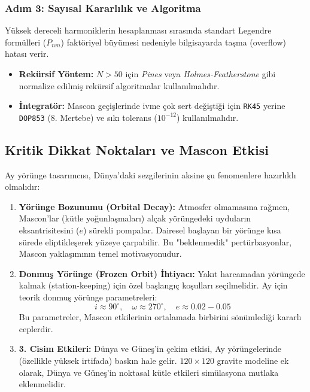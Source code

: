 \subsubsection{Adım 3: Sayısal Kararlılık ve Algoritma}
Yüksek dereceli harmoniklerin hesaplanması sırasında standart Legendre formülleri ($P_{nm}$) faktöriyel büyümesi nedeniyle bilgisayarda taşma (overflow) hatası verir.
\begin{itemize}
    \item \textbf{Rekürsif Yöntem:} $N > 50$ için \textit{Pines} veya \textit{Holmes-Featherstone} gibi normalize edilmiş rekürsif algoritmalar kullanılmalıdır.
    \item \textbf{İntegratör:} Mascon geçişlerinde ivme çok sert değiştiği için \texttt{RK45} yerine \texttt{DOP853} (8. Mertebe) ve sıkı tolerans ($10^{-12}$) kullanılmalıdır.
\end{itemize}

\subsection{Kritik Dikkat Noktaları ve Mascon Etkisi}

Ay yörünge tasarımcısı, Dünya'daki sezgilerinin aksine şu fenomenlere hazırlıklı olmalıdır:

\begin{enumerate}
    \item \textbf{Yörünge Bozunumu (Orbital Decay):} 
    Atmosfer olmamasına rağmen, Mascon'lar (kütle yoğunlaşmaları) alçak yörüngedeki uyduların eksantrisitesini ($e$) sürekli pompalar. Dairesel başlayan bir yörünge kısa sürede eliptikleşerek yüzeye çarpabilir. Bu "beklenmedik" pertürbasyonlar, Mascon yaklaşımının temel motivasyonudur.
    
    \item \textbf{Donmuş Yörünge (Frozen Orbit) İhtiyacı:}
    Yakıt harcamadan yörüngede kalmak (station-keeping) için özel başlangıç koşulları seçilmelidir. Ay için teorik donmuş yörünge parametreleri:
    \begin{equation}
        i \approx 90^\circ, \quad \omega \approx 270^\circ, \quad e \approx 0.02 - 0.05
    \end{equation}
    Bu parametreler, Mascon etkilerinin ortalamada birbirini sönümlediği kararlı ceplerdir.

    \item \textbf{3. Cisim Etkileri:}
    Dünya ve Güneş'in çekim etkisi, Ay yörüngelerinde (özellikle yüksek irtifada) baskın hale gelir. $120 \times 120$ gravite modeline ek olarak, Dünya ve Güneş'in noktasal kütle etkileri simülasyona mutlaka eklenmelidir.
\end{enumerate}


